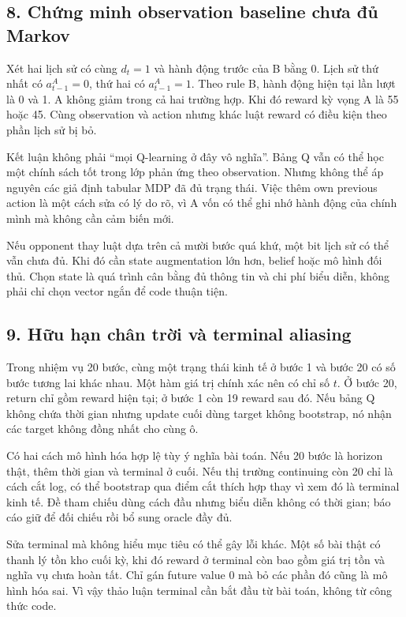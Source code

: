 \subsection{8. Chứng minh observation baseline chưa đủ
Markov}\label{chux1ee9ng-minh-observation-baseline-chux1b0a-ux111ux1ee7-markov}

Xét hai lịch sử có cùng \(d_t=1\) và hành động trước của B bằng 0. Lịch
sử thứ nhất có \(a^A_{t-1}=0\), thứ hai có \(a^A_{t-1}=1\). Theo rule B,
hành động hiện tại lần lượt là 0 và 1. A không giảm trong cả hai trường
hợp. Khi đó reward kỳ vọng A là 55 hoặc 45. Cùng observation và action
nhưng khác luật reward có điều kiện theo phần lịch sử bị bỏ.

Kết luận không phải ``mọi Q-learning ở đây vô nghĩa''. Bảng Q vẫn có thể
học một chính sách tốt trong lớp phản ứng theo observation. Nhưng không
thể áp nguyên các giả định tabular MDP đã đủ trạng thái. Việc thêm own
previous action là một cách sửa có lý do rõ, vì A vốn có thể ghi nhớ
hành động của chính mình mà không cần cảm biến mới.

Nếu opponent thay luật dựa trên cả mười bước quá khứ, một bit lịch sử có
thể vẫn chưa đủ. Khi đó cần state augmentation lớn hơn, belief hoặc mô
hình đối thủ. Chọn state là quá trình cân bằng đủ thông tin và chi phí
biểu diễn, không phải chỉ chọn vector ngắn để code thuận tiện.

\subsection{9. Hữu hạn chân trời và terminal
aliasing}\label{hux1eefu-hux1ea1n-chuxe2n-trux1eddi-vuxe0-terminal-aliasing}

Trong nhiệm vụ 20 bước, cùng một trạng thái kinh tế ở bước 1 và bước 20
có số bước tương lai khác nhau. Một hàm giá trị chính xác nên có chỉ số
\(t\). Ở bước 20, return chỉ gồm reward hiện tại; ở bước 1 còn 19 reward
sau đó. Nếu bảng Q không chứa thời gian nhưng update cuối dùng target
không bootstrap, nó nhận các target không đồng nhất cho cùng ô.

Có hai cách mô hình hóa hợp lệ tùy ý nghĩa bài toán. Nếu 20 bước là
horizon thật, thêm thời gian và terminal ở cuối. Nếu thị trường
continuing còn 20 chỉ là cách cắt log, có thể bootstrap qua điểm cắt
thích hợp thay vì xem đó là terminal kinh tế. Đề tham chiếu dùng cách
đầu nhưng biểu diễn không có thời gian; báo cáo giữ để đối chiếu rồi bổ
sung oracle đầy đủ.

Sửa terminal mà không hiểu mục tiêu có thể gây lỗi khác. Một số bài thật
có thanh lý tồn kho cuối kỳ, khi đó reward ở terminal còn bao gồm giá
trị tồn và nghĩa vụ chưa hoàn tất. Chỉ gán future value 0 mà bỏ các phần
đó cũng là mô hình hóa sai. Vì vậy thảo luận terminal cần bắt đầu từ bài
toán, không từ công thức code.

